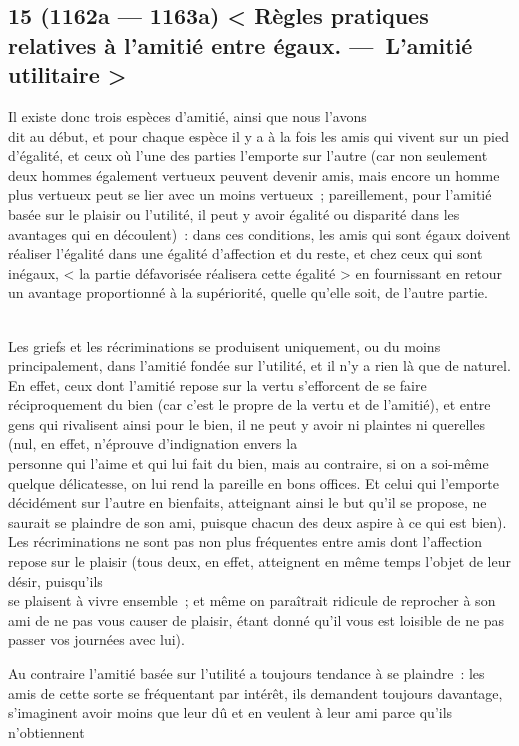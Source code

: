 \documentclass[french,twoside]{book} %
\begin{document}
\subsection[{15 (1162a — 1163a) < Règles pratiques relatives à l’amitié entre égaux. — L’amitié utilitaire >}]{15 (1162a — 1163a) < Règles pratiques relatives à l’amitié entre égaux. — L’amitié utilitaire >}
\noindent Il existe donc trois espèces d’amitié, ainsi que nous l’avons \\
dit au début, et pour chaque espèce il y a à la fois les amis qui vivent sur un pied d’égalité, et ceux où l’une des parties l’emporte sur l’autre (car non seulement deux hommes également vertueux peuvent devenir amis, mais encore un homme plus vertueux peut se lier avec un moins vertueux ; pareillement,  pour l’amitié basée sur le plaisir ou l’utilité, il peut y avoir égalité ou disparité dans les avantages qui en découlent) : dans ces conditions, les amis qui sont égaux doivent réaliser l’égalité dans une égalité d’affection et du reste, et chez ceux qui sont inégaux, < la partie défavorisée réalisera cette égalité > en fournissant en retour un avantage proportionné à la supériorité, quelle qu’elle soit, de l’autre partie.\par
\\
Les griefs et les récriminations se produisent uniquement, ou du moins principalement, dans l’amitié fondée sur l’utilité, et il n’y a rien là que de naturel. En effet, ceux dont l’amitié repose sur la vertu s’efforcent de se faire réciproquement du bien (car c’est le propre de la vertu et de l’amitié), et entre gens qui rivalisent ainsi pour le bien, il ne peut y avoir ni plaintes ni querelles (nul, en effet, n’éprouve d’indignation envers la \\
personne qui l’aime et qui lui fait du bien, mais au contraire, si on a soi-même quelque délicatesse, on lui rend la pareille en bons offices. Et celui qui l’emporte décidément sur l’autre en bienfaits, atteignant ainsi le but qu’il se propose, ne saurait se plaindre de son ami, puisque chacun des deux aspire à ce qui est bien). Les récriminations ne sont pas non plus fréquentes entre amis dont l’affection repose sur le plaisir (tous deux, en effet, atteignent en même temps l’objet de leur désir, puisqu’ils \\
se plaisent à vivre ensemble ; et même on paraîtrait ridicule de reprocher à son ami de ne pas vous causer de plaisir, étant donné qu’il vous est loisible de ne pas passer vos journées avec lui).\par
Au contraire l’amitié basée sur l’utilité a toujours tendance à se plaindre : les amis de cette sorte se fréquentant par intérêt, ils demandent toujours davantage, s’imaginent avoir moins que leur dû et en veulent à leur ami parce qu’ils n’obtiennent \\
\end{document}

